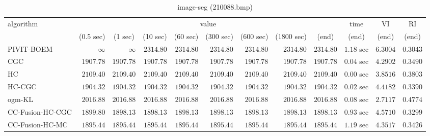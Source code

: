 \begin{table}[H]
\scriptsize
\centering
\caption{image-seg (210088.bmp)}
\label{tab:anytimetable-image-seg-210088.bmp}
\begin{tabular}{lrrrrrrrrrrr}
\toprule
           algorithm &                                   \multicolumn{8}{c}{value} & \multicolumn{1}{c}{time}    & \multicolumn{1}{c}{VI}  & \multicolumn{1}{c}{RI} \\  
\cmidrule(lr){2-9}\cmidrule(lr){10-10} \cmidrule(lr){11-11} \cmidrule(lr){12-12}   
                     & \multicolumn{1}{c}{(0.5 sec)} & \multicolumn{1}{c}{(1 sec)} & \multicolumn{1}{c}{(10 sec)} & \multicolumn{1}{c}{(60 sec)} & \multicolumn{1}{c}{(300 sec)} & \multicolumn{1}{c}{(600 sec)} & \multicolumn{1}{c}{(1800 sec)} & \multicolumn{1}{c}{(end)} & \multicolumn{1}{c}{(end)}    & \multicolumn{1}{c}{(end)}   & \multicolumn{1}{c}{(end)}  \\ \midrule 
          PIVIT-BOEM & $\infty$ & $\infty$ & $      2314.80$ & $      2314.80$ & $      2314.80$ & $      2314.80$ & $      2314.80$ & $      2314.80$ & $         1.18$ sec    & $       6.3004$  & $       0.3043$ \\ 
                 CGC & $      1907.78$ & $      1907.78$ & $      1907.78$ & $      1907.78$ & $      1907.78$ & $      1907.78$ & $      1907.78$ & $      1907.78$ & $         0.04$ sec    & $       4.2902$  & $       0.3490$ \\ 
                  HC & $      2109.40$ & $      2109.40$ & $      2109.40$ & $      2109.40$ & $      2109.40$ & $      2109.40$ & $      2109.40$ & $      2109.40$ & $         0.00$ sec    & $       3.8516$  & $       0.3803$ \\ 
              HC-CGC & $      1904.32$ & $      1904.32$ & $      1904.32$ & $      1904.32$ & $      1904.32$ & $      1904.32$ & $      1904.32$ & $      1904.32$ & $         0.02$ sec    & $       4.4182$  & $       0.3390$ \\ 
              ogm-KL & $      2016.88$ & $      2016.88$ & $      2016.88$ & $      2016.88$ & $      2016.88$ & $      2016.88$ & $      2016.88$ & $      2016.88$ & $         0.08$ sec    & $       2.7117$  & $       0.4774$ \\ 
    CC-Fusion-HC-CGC & $      1899.80$ & $      1898.13$ & $      1898.13$ & $      1898.13$ & $      1898.13$ & $      1898.13$ & $      1898.13$ & $      1898.13$ & $         0.93$ sec    & $       4.5710$  & $       0.3299$ \\ 
     CC-Fusion-HC-MC & $      1895.44$ & $      1895.44$ & $      1895.44$ & $      1895.44$ & $      1895.44$ & $      1895.44$ & $      1895.44$ & $      1895.44$ & $         1.19$ sec    & $       4.3517$  & $       0.3426$ \\ 

\end{tabular}
\end{table}
